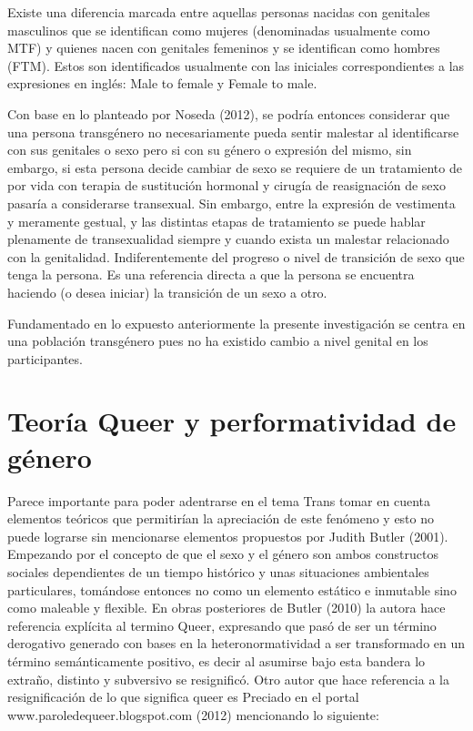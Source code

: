 Existe una diferencia marcada entre aquellas personas nacidas con genitales
masculinos que se identifican como mujeres (denominadas usualmente como MTF) y
quienes nacen con genitales femeninos y se identifican como hombres (FTM).
Estos son identificados usualmente con las iniciales correspondientes a las
expresiones en inglés: Male to female y Female to male.

Con base en lo planteado por Noseda (2012), se podría entonces considerar que una
persona transgénero no necesariamente pueda sentir malestar al identificarse con
sus genitales o sexo pero si con su género o expresión del mismo, sin embargo,
si esta persona decide cambiar de sexo se requiere de un tratamiento de por vida
con terapia de sustitución hormonal y cirugía de reasignación de sexo pasaría a
considerarse transexual.
Sin embargo, entre la expresión de vestimenta y meramente gestual, y las
distintas etapas de tratamiento se puede hablar plenamente de transexualidad
siempre y cuando exista un malestar relacionado con la genitalidad.
Indiferentemente del progreso o nivel de transición de sexo que tenga la
persona.
Es una referencia directa a que la persona se encuentra haciendo (o desea
iniciar) la transición de un sexo a otro.

Fundamentado en lo expuesto anteriormente la presente investigación se centra en
una población transgénero pues no ha existido cambio a nivel genital en los
participantes.

\section{Teoría Queer y performatividad de género}
Parece importante para poder adentrarse en el tema Trans tomar en cuenta
elementos teóricos que permitirían la apreciación de este fenómeno y esto no
puede lograrse sin mencionarse elementos propuestos por Judith Butler (2001).
Empezando por el concepto de que el sexo y el género son ambos constructos
sociales dependientes de un tiempo histórico y unas situaciones ambientales
particulares, tomándose entonces no como un elemento estático e inmutable sino
como maleable y flexible.
En obras posteriores de Butler (2010) la autora hace referencia explícita al
termino Queer, expresando que pasó de ser un término derogativo generado con
bases en la heteronormatividad a ser transformado en un término semánticamente
positivo, es decir al asumirse bajo esta bandera lo extraño, distinto y
subversivo se resignificó.
Otro autor que hace referencia a la resignificación de lo que significa queer es
Preciado en el portal www.paroledequeer.blogspot.com (2012) mencionando lo
siguiente:

